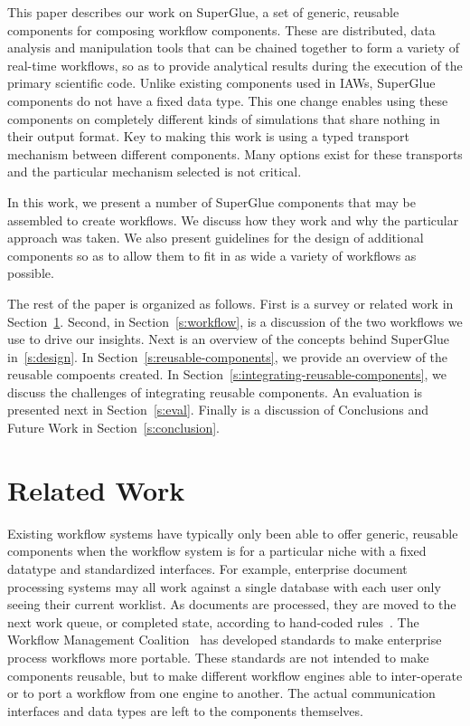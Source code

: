 \documentclass[conference]{IEEEtran}
\begin{document}
This paper describes our work on SuperGlue, a set of generic, reusable
components for composing workflow components. These are distributed, data
analysis and manipulation tools that can be chained together to form a variety
of real-time workflows, so as to provide analytical results during the
execution of the primary scientific code. Unlike existing components used in
IAWs, SuperGlue components do not have a fixed data type. This one change
enables using these components on completely different kinds of simulations
that share nothing in their output format. Key to making this work is using a
typed transport mechanism between different components. Many options exist for
these transports and the particular mechanism selected is not critical. 

In this work, we present a number of SuperGlue components that may be
assembled to create workflows. We discuss how they work and why the particular
approach was taken.  We also present guidelines for the design of additional
components so as to allow them to fit in as wide a variety of workflows as
possible. 

The rest of the paper is organized as follows. First is a survey or related
work in Section~\ref{s:related}. Second, in Section~\ref{s:workflow}, is a
discussion of the two workflows we use to drive our insights. Next is an
overview of the concepts behind SuperGlue in~\ref{s:design}.  In
Section~\ref{s:reusable-components}, we provide an overview of the reusable
compoents created. In Section~\ref{s:integrating-reusable-components}, we
discuss the challenges of integrating reusable components.  An evaluation is
presented next in Section~\ref{s:eval}. Finally is a discussion of Conclusions
and Future Work in Section~\ref{s:conclusion}.

\section{Related Work}
\label{s:related}

Existing workflow systems have typically only been able to offer generic,
reusable components when the workflow system is for a particular niche with a
fixed datatype and standardized interfaces. For example, enterprise document
processing systems may all work against a single database with each user only
seeing their current worklist. As documents are processed, they are moved to
the next work queue, or completed state, according to hand-coded
rules~\cite{mckesson-workflow}. The Workflow Management Coalition~\cite{wfmc}
has developed standards to make enterprise process workflows more portable.
These standards are not intended to make components reusable, but to make
different workflow engines able to inter-operate or to port a workflow from one
engine to another.  The actual communication interfaces and data types are left
to the components themselves.
\end{document}

